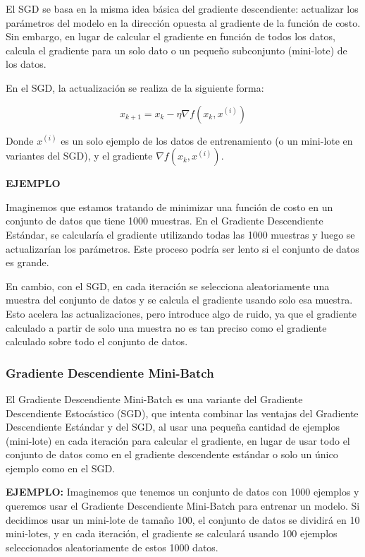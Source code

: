 \documentclass{article}
\begin{document}
	El SGD se basa en la misma idea básica del gradiente descendiente: actualizar los parámetros del modelo en la dirección opuesta al gradiente de la función de costo. Sin embargo, en lugar de calcular el gradiente en función de todos los datos, calcula el gradiente para un solo dato o un pequeño subconjunto (mini-lote) de los datos.
	
	En el SGD, la actualización se realiza de la siguiente forma:
	
	\[
	x_{k+1} = x_k - \eta \nabla f(x_k, x^{(i)})
	\]
	
	Donde \( x^{(i)} \) es un solo ejemplo de los datos de entrenamiento (o un mini-lote en variantes del SGD), y el gradiente \( \nabla f(x_k, x^{(i)}) \).
	
	\textbf{EJEMPLO}
	
	Imaginemos que estamos tratando de minimizar una función de costo en un conjunto de datos que tiene 1000 muestras. En el Gradiente Descendiente Estándar, se calcularía el gradiente utilizando todas las 1000 muestras y luego se actualizarían los parámetros. Este proceso podría ser lento si el conjunto de datos es grande.
	
	En cambio, con el SGD, en cada iteración se selecciona aleatoriamente una muestra del conjunto de datos y se calcula el gradiente usando solo esa muestra. Esto acelera las actualizaciones, pero introduce algo de ruido, ya que el gradiente calculado a partir de solo una muestra no es tan preciso como el gradiente calculado sobre todo el conjunto de datos.
	
	\subsubsection{Gradiente Descendiente Mini-Batch}
	
	El Gradiente Descendiente Mini-Batch es una variante del Gradiente Descendiente Estocástico (SGD), que intenta combinar las ventajas del Gradiente Descendiente Estándar y del SGD, al usar una pequeña cantidad de ejemplos (mini-lote) en cada iteración para calcular el gradiente, en lugar de usar todo el conjunto de datos como en el gradiente descendente estándar o solo un único ejemplo como en el SGD.
	
	\textbf{EJEMPLO:}
	Imaginemos que tenemos un conjunto de datos con 1000 ejemplos y queremos usar el Gradiente Descendiente Mini-Batch para entrenar un modelo. Si decidimos usar un mini-lote de tamaño 100, el conjunto de datos se dividirá en 10 mini-lotes, y en cada iteración, el gradiente se calculará usando 100 ejemplos seleccionados aleatoriamente de estos 1000 datos.
	
\end{document}
